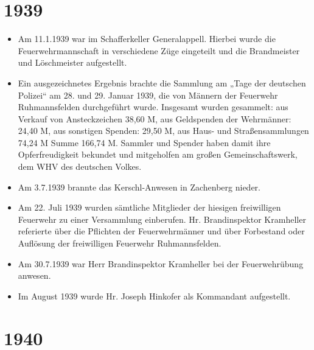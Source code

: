 \documentclass[12pt,a4paper]{book}
\begin{document}
\section*{1939}

\begin{itemize}
\item Am 11.1.1939 war im Schafferkeller Generalappell. Hierbei wurde die
Feuerwehrmannschaft in verschiedene Züge eingeteilt und die Brandmeister und
Löschmeister aufgestellt.

\item Ein ausgezeichnetes Ergebnis brachte die Sammlung am „Tage der deutschen
Polizei“ am 28. und 29. Januar 1939, die von Männern der Feuerwehr
Ruhmannsfelden durchgeführt wurde. Insgesamt wurden gesammelt: aus Verkauf von
Ansteckzeichen 38,60 M, aus Geldspenden der Wehrmänner: 24,40 M, aus sonstigen
Spenden: 29,50 M, aus Haus- und Straßensammlungen 74,24 M Summe 166,74 M.
Sammler und Spender haben damit ihre Opferfreudigkeit bekundet und mitgeholfen
am großen Gemeinschaftswerk, dem WHV des deutschen Volkes.

\item Am 3.7.1939 brannte das Kerschl-Anwesen in Zachenberg nieder.

\item Am 22. Juli 1939 wurden sämtliche Mitglieder der hiesigen freiwilligen
Feuerwehr zu einer Versammlung einberufen. Hr. Brandinspektor Kramheller
referierte über die Pflichten der Feuerwehrmänner und über Forbestand oder
Auflösung der freiwilligen Feuerwehr Ruhmannsfelden.

\item Am 30.7.1939 war Herr Brandinspektor Kramheller bei der Feuerwehrübung
anwesen.

\item Im August 1939 wurde Hr. Joseph Hinkofer als Kommandant aufgestellt.
\end{itemize}

\section*{1940}
\end{document}
